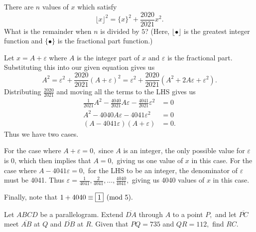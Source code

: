 \documentclass[letterpaper,oneside]{scrartcl}
\begin{document}
\begin{problem*}
  There are $n$ values of $x$ which satisfy
  \[\lfloor x \rfloor ^2 = \{x\}^2 + \dfrac{2020}{2021}x^2.\]
  What is the remainder when $n$ is divided by $5$? (Here, $\lfloor\bullet\rfloor$ is the greatest integer function and $\{\bullet\}$ is the fractional part function.)
\end{problem*}
\begin{soln}
  Let \(x=A+\varepsilon\) where \(A\) is the integer part of \(x\) and \(\varepsilon\) is the fractional part. Substituting this into our given equation gives us
  \[A^2 = \varepsilon^2 + \frac{2020}{2021}(A+\varepsilon)^2 = \varepsilon^2 + \frac{2020}{2021}(A^2+2A\varepsilon+\varepsilon^2).\]
  Distributing \(\tfrac{2020}{2021}\) and moving all the terms to the LHS gives us
  \begin{align*}
    \frac{1}{2021}A^2-\frac{4040}{2021}A\varepsilon - \frac{4041}{2021}\varepsilon^2 &= 0\\
    A^2-4040A\varepsilon-4041\varepsilon^2 &= 0 \\
    (A-4041\varepsilon)(A+\varepsilon) &= 0.
  \end{align*}
  Thus we have two cases. 
  \begin{itemize}
    \ii  For the case where \(A+\varepsilon=0,\) since \(A\) is an integer, the only possible value for \(\varepsilon\) is 0, which then implies that \(A=0,\) giving us one value of \(x\) in this case.
    \ii For the case where \(A-4041\varepsilon =0,\) for the LHS to be an integer, the denominator of \(\varepsilon\) must be 4041. Thus \(\varepsilon = \tfrac{1}{4041},\tfrac{2}{4041},\dots,\tfrac{4040}{4041},\) giving us 4040 values of \(x\) in this case.
  \end{itemize}
  Finally, note that \(1+4040 \equiv \fbox{1} \pmod{5}.\)
\end{soln}
\newpage
\begin{problem*}
  [AIME 1998 \# 6]
  Let $ABCD$ be a parallelogram. Extend $\overline{DA}$ through $A$ to a point $P,$ and let $\overline{PC}$ meet $\overline{AB}$ at $Q$ and $\overline{DB}$ at $R.$ Given that $PQ=735$ and $QR=112,$ find $RC.$
\end{problem*}
\end{document}
